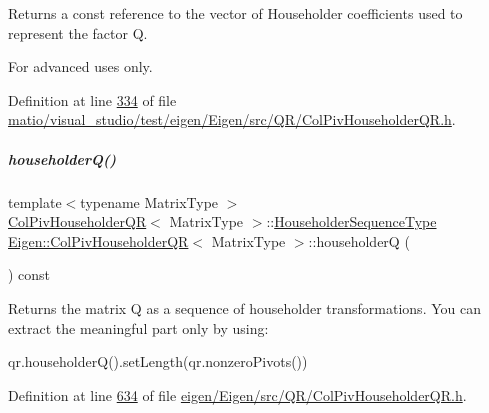 \begin{DoxyReturn}{Returns}
a const reference to the vector of Householder coefficients used to represent the factor {\ttfamily Q}.
\end{DoxyReturn}
For advanced uses only. 

Definition at line \hyperlink{matio_2visual__studio_2test_2eigen_2_eigen_2src_2_q_r_2_col_piv_householder_q_r_8h_source_l00334}{334} of file \hyperlink{matio_2visual__studio_2test_2eigen_2_eigen_2src_2_q_r_2_col_piv_householder_q_r_8h_source}{matio/visual\+\_\+studio/test/eigen/\+Eigen/src/\+Q\+R/\+Col\+Piv\+Householder\+Q\+R.\+h}.

\mbox{\label{group___q_r___module_a28ab9d8916ca609c5469c4c192fbfa28}} 
\subparagraph{\texorpdfstring{householder\+Q()}{householderQ()}}
{\footnotesize\ttfamily template$<$typename Matrix\+Type $>$ \\
\hyperlink{group___q_r___module_class_eigen_1_1_col_piv_householder_q_r}{Col\+Piv\+Householder\+QR}$<$ Matrix\+Type $>$\+::\hyperlink{group___householder___module_class_eigen_1_1_householder_sequence}{Householder\+Sequence\+Type} \hyperlink{group___q_r___module_class_eigen_1_1_col_piv_householder_q_r}{Eigen\+::\+Col\+Piv\+Householder\+QR}$<$ Matrix\+Type $>$\+::householderQ (\begin{DoxyParamCaption}{ }\end{DoxyParamCaption}) const}

\begin{DoxyReturn}{Returns}
the matrix Q as a sequence of householder transformations. You can extract the meaningful part only by using\+: 
\begin{DoxyCode}
qr.householderQ().setLength(qr.nonzeroPivots()) 
\end{DoxyCode}
 
\end{DoxyReturn}


Definition at line \hyperlink{eigen_2_eigen_2src_2_q_r_2_col_piv_householder_q_r_8h_source_l00634}{634} of file \hyperlink{eigen_2_eigen_2src_2_q_r_2_col_piv_householder_q_r_8h_source}{eigen/\+Eigen/src/\+Q\+R/\+Col\+Piv\+Householder\+Q\+R.\+h}.

